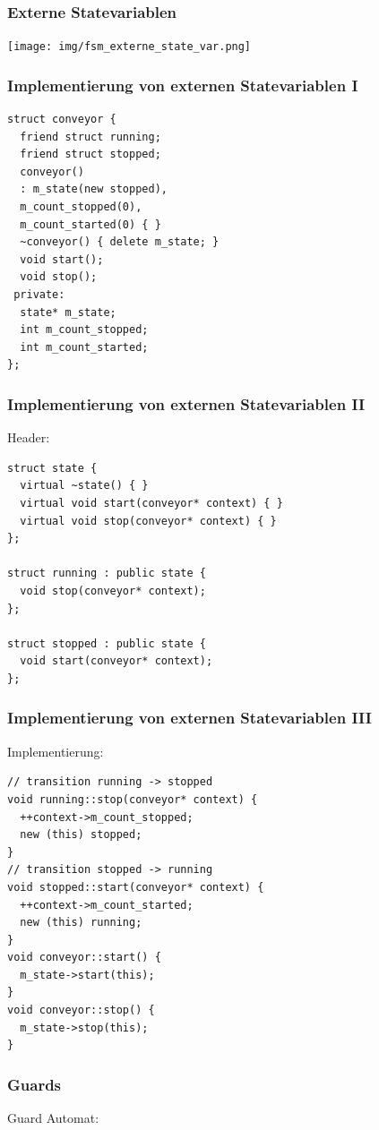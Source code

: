 \documentclass{beamer}
\begin{document}
\begin{frame}
 \frametitle{Externe Statevariablen}
  \texttt{[image: img/fsm\_externe\_state\_var.png]}
\end{frame}

\begin{frame}[fragile]
 \frametitle{Implementierung von externen Statevariablen I}
 \begin{lstlisting}
struct conveyor {
  friend struct running;
  friend struct stopped;
  conveyor()
  : m_state(new stopped),
  m_count_stopped(0),
  m_count_started(0) { }
  ~conveyor() { delete m_state; }
  void start();
  void stop();
 private:
  state* m_state;
  int m_count_stopped;
  int m_count_started;
};
\end{lstlisting}
\end{frame}

\begin{frame}[fragile]
  \frametitle{Implementierung von externen Statevariablen II}
  Header:
  \begin{lstlisting}
struct state {
  virtual ~state() { }
  virtual void start(conveyor* context) { }
  virtual void stop(conveyor* context) { }
};

struct running : public state {
  void stop(conveyor* context);
};

struct stopped : public state {
  void start(conveyor* context);
};
  \end{lstlisting}

\end{frame}

\begin{frame}[fragile]
  \frametitle{Implementierung von externen Statevariablen III}
  Implementierung:
  \begin{lstlisting}
// transition running -> stopped
void running::stop(conveyor* context) {
  ++context->m_count_stopped;
  new (this) stopped;
}
// transition stopped -> running
void stopped::start(conveyor* context) {
  ++context->m_count_started;
  new (this) running;
}
void conveyor::start() {
  m_state->start(this);
}
void conveyor::stop() {
  m_state->stop(this);
}
  \end{lstlisting}

\end{frame}

\begin{frame}
 \frametitle{Guards}
 Guard Automat:
\end{frame}
\end{document}
